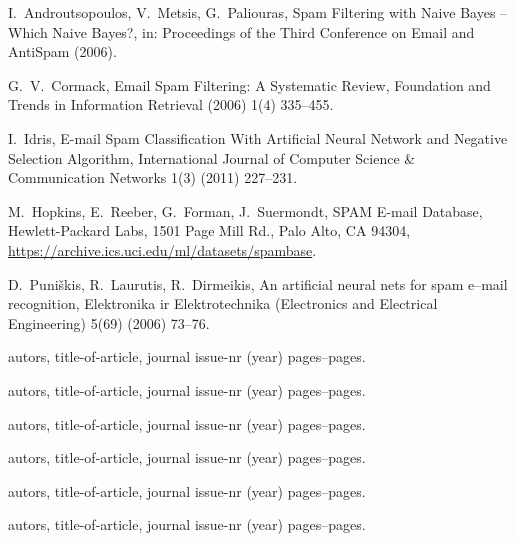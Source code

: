 \documentclass[12pt,a4paper]{article}
\begin{document}
\begin{thebibliography}{99}
\begin{small}
  I.\ Androutsopoulos, V.\ Metsis, G.\ Paliouras,
  Spam Filtering with Naive Bayes -- Which Naive Bayes?,
  in: Proceedings of the Third Conference on Email and AntiSpam (2006).

  G.\ V.\ Cormack, 
  Email Spam Filtering: A Systematic Review,
  Foundation and Trends in Information Retrieval (2006) 1(4) 335--455.

  I.\ Idris, 
  E-mail Spam Classification With Artificial Neural Network and Negative Selection Algorithm,
   International Journal of Computer Science \& Communication Networks 1(3) (2011) 227--231.

  M.\ Hopkins, E.\ Reeber, G.\ Forman, J.\ Suermondt, 
  SPAM E-mail Database,
  Hewlett-Packard Labs, 1501 Page Mill Rd., Palo Alto, CA 94304,
  \url{https://archive.ics.uci.edu/ml/datasets/spambase}.

  D.\ Puni\v skis, R.\ Laurutis, R.\ Dirmeikis,
  An artificial neural nets for spam e–mail recognition,
  Elektronika ir Elektrotechnika (Electronics and Electrical Engineering) 5(69) (2006) 73--76.

  autors, 
  title-of-article,
  journal issue-nr (year) pages--pages.


  autors, 
  title-of-article,
  journal issue-nr (year) pages--pages.

 
  autors, 
  title-of-article,
  journal issue-nr (year) pages--pages.


        
        
  autors, 
  title-of-article,
  journal issue-nr (year) pages--pages.

  autors, 
  title-of-article,
  journal issue-nr (year) pages--pages.


  autors, 
  title-of-article,
  journal issue-nr (year) pages--pages.
\end{small}
\end{thebibliography}
\end{document}
